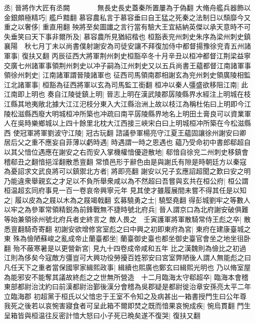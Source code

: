 丞|{
	晉將作大匠有丞闕　　　　無長史長史蓋秦所置屢為于偽翻}
大脩舟艦兵器飾以金銀頗極精巧|{
	艦戶黯翻}
慕容農私言于慕容垂曰自王猛之死秦之法制日以頹靡今又重之以奢侈|{
	重直用翻}
殃將至矣圖䜟之言行當有驗大王宜結納英傑以承天意時不可失垂笑曰天下事非爾所及|{
	慕容農所見猶紹楷也}
桓豁表兖州刺史朱序為梁州刺史鎮襄陽　秋七月丁未以尚書僕射謝安為司徒安讓不拜復加侍中都督揚豫徐兖青五州諸軍事|{
	復扶又翻}
丙辰征西大將軍荆州刺史桓豁卒冬十月辛丑以桓冲都督江荆梁益寧交廣七州諸軍事領荆州刺史以冲子嗣為江州刺史又以五兵尚書王藴都督江南諸軍事領徐州刺史|{
	江南諸軍謂晉陵諸軍也}
征西司馬領南郡相謝玄為兖州刺史領廣陵相監江北諸軍事|{
	桓豁為征西將軍以玄為司馬監工銜翻}
桓冲以秦人彊盛欲移阻江南|{
	此江南即上明也}
奏自江陵徙鎮上明|{
	晉志上明在漢武陵郡孱陵縣界水經注上明城在枝江縣其地夷敞北據大江江汜枝分東入大江縣治洲上故以枝江為稱杜佑曰上明即今江陵松滋縣西廢大明城桓冲所築也冲疏曰南平孱陵縣界地名上明田土膏良可以資業軍人在吳時樂鄉城以上四十餘里北枕大江西接三峽宋白曰上明城桓冲所築在今松滋縣西}
使冠軍將軍劉波守江陵|{
	冠古玩翻}
諮議參軍楊亮守江夏王藴固讓徐州謝安曰卿居后父之重不應妄自菲薄以虧時遇|{
	時遇謂一時之恩遇也}
藴乃受命初中書郎郗超自以其父愔位遇應在謝安之右而安入掌機權愔優遊散地|{
	郗愔自徐兖二州刺史移鎮會稽郗丑之翻愔挹淫翻散悉亶翻}
常憤邑形于辭色由是與謝氏有隙是時朝廷方以秦寇為憂詔求文武良將可以鎮禦北方者|{
	將即亮翻}
謝安以兄子玄應詔超聞之歎曰安之明乃能違衆舉親玄之才足以不負所舉衆咸以為不然超曰吾嘗與玄共在桓公府|{
	桓公謂桓温超玄同府事見一百一卷哀帝興寧元年}
見其使才雖履展間未嘗不得其任是以知之|{
	履以皮為之屐以木為之屐竭戟翻}
玄募驍勇之士|{
	驍堅堯翻}
得彭城劉牢之等數人以牢之為參軍常領精鋭為前鋒戰無不捷時號北府兵|{
	晉人謂京口為北府謝安破俱難等始兼領徐州號北府兵者史終言之}
敵人畏之　壬寅護軍將軍散騎常侍王彪之卒|{
	散悉亶翻騎奇寄翻}
初謝安欲增修宮室彪之曰中興之初即東府為宮|{
	東府在建康臺城之東}
殊為儉陋蘇峻之亂成帝止蘭臺都坐|{
	蘭臺御史臺也都坐御史臺官會坐之地坐徂卧翻}
殆不蔽寒暑是以更營新宮|{
	見九十四卷成帝咸和五年}
比之漢魏則為儉比之初過江則為侈矣今寇敵方彊豈可大興功役勞擾百姓邪安曰宮室弊陋後人謂人無能彪之曰凡任天下之重者當保國寧家緝熙政事|{
	緝續也熙廣也鄭玄曰緝熙光明也}
乃以脩室屋為能邪安不能奪其議故終彪之之世無所營造　十二月臨海太守郗超卒|{
	臨海本會稽東部都尉治沈約曰前漢都尉治鄞後漢分會稽為吳郡疑是都尉徙治章安孫亮太平二年立臨海郡}
初超黨于桓氏以父愔忠于王室不令知之及病甚出一箱書授門生曰公年尊我死之後若以哀惋害寢食者可呈此箱不爾即焚之既而愔果哀惋成疾|{
	惋烏貫翻}
門生呈箱皆與桓温往反密計愔大怒曰小子死已晩矣遂不復哭|{
	復扶又翻}


